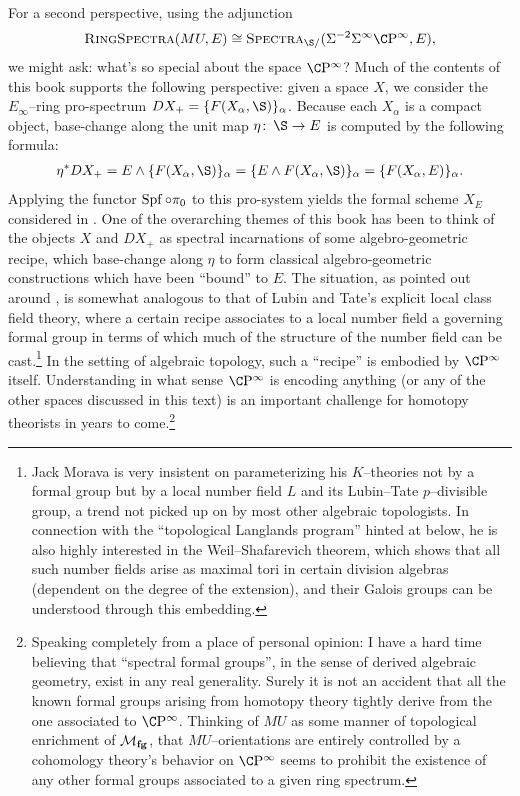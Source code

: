 For a second perspective, using the adjunction \[\CatOf{RingSpectra}(MU, E) \cong \CatOf{Spectra}_{\S/}(\Susp^{-2} \Susp^\infty \CP^\infty, E),\] we might ask: what's so special about the space \(\CP^\infty\)?  Much of the contents of this book supports the following perspective: given a space \(X\), we consider the \(E_\infty\)--ring pro-spectrum \(DX_+ = \{F(X_\alpha, \S)\}_\alpha\).  Because each \(X_\alpha\) is a compact object, base-change along the unit map \(\eta\co \S \to E\) is computed by the following formula:
\begin{align*}
\eta^* DX_+ = E \sm \{F(X_\alpha, \S)\}_\alpha = \{E \sm F(X_\alpha, \S)\}_\alpha = \{F(X_\alpha, E)\}_\alpha.
\end{align*}
Applying the functor \(\operatorname{Spf} \circ \pi_0\) to this pro-system yields the formal scheme \(X_E\) considered in .  One of the overarching themes of this book has been to think of the objects \(X\) and \(DX_+\) as spectral incarnations of some algebro-geometric recipe, which base-change along \(\eta\) to form classical algebro-geometric constructions which have been ``bound'' to \(E\).  The situation, as pointed out around , is somewhat analogous to that of Lubin and Tate's explicit local class field theory, where a certain recipe associates to a local number field a governing formal group in terms of which much of the structure of the number field can be cast.\footnote{Jack Morava is very insistent on parameterizing his \(K\)--theories not by a formal group but by a local number field \(L\) and its Lubin--Tate \(p\)--divisible group, a trend not picked up on by most other algebraic topologists.  In connection with the ``topological Langlands program'' hinted at below, he is also highly interested in the Weil--Shafarevich theorem\cite[Appendix III]{Weil}, which shows that all such number fields arise as maximal tori in certain division algebras (dependent on the degree of the extension), and their Galois groups can be understood through this embedding.}  In the setting of algebraic topology, such a ``recipe'' is embodied by \(\CP^\infty\) itself.  Understanding in what sense \(\CP^\infty\) is encoding anything (or any of the other spaces discussed in this text) is an important challenge for homotopy theorists in years to come.\footnote{Speaking completely from a place of personal opinion: I have a hard time believing that ``spectral formal groups'', in the sense of derived algebraic geometry, exist in any real generality.  Surely it is not an accident that all the known formal groups arising from homotopy theory tightly derive from the one associated to \(\CP^\infty\).  Thinking of \(MU\) as some manner of topological enrichment of \(\mathcal{M}_{\mathbf{fg}}\), that \(MU\)--orientations are entirely controlled by a cohomology theory's behavior on \(\CP^\infty\) seems to prohibit the existence of any other formal groups associated to a given ring spectrum.}









